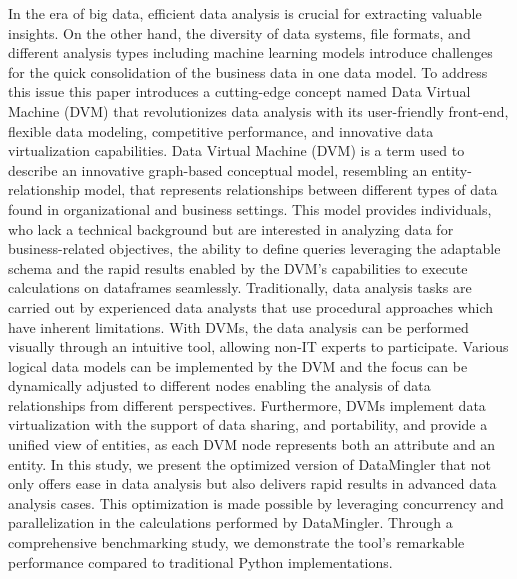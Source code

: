 In the era of big data, efficient data analysis is crucial for extracting valuable insights. On the other hand, the diversity of data systems, file formats, and different analysis types including machine learning models introduce challenges for the quick consolidation of the business data in one data model. To address this issue this paper introduces a cutting-edge concept named Data Virtual Machine (DVM) that revolutionizes data analysis with its user-friendly front-end, flexible data modeling, competitive performance, and innovative data virtualization capabilities. Data Virtual Machine (DVM) is a term used to describe an innovative graph-based conceptual model, resembling an entity-relationship model, that represents relationships between different types of data found in organizational and business settings. This model provides individuals, who lack a technical background but are interested in analyzing data for business-related objectives, the ability to define queries leveraging the adaptable schema and the rapid results enabled by the DVM's capabilities to execute calculations on dataframes seamlessly. Traditionally, data analysis tasks are carried out by experienced data analysts that use procedural approaches which have inherent limitations. With DVMs, the data analysis can be performed visually through an intuitive tool, allowing non-IT experts to participate. Various logical data models can be implemented by the DVM and the focus can be dynamically adjusted to different nodes enabling the analysis of data relationships from different perspectives. Furthermore, DVMs implement data virtualization with the support of data sharing, and portability, and provide a unified view of entities, as each DVM node represents both an attribute and an entity. In this study, we present the optimized version of DataMingler that not only offers ease in data analysis but also delivers rapid results in advanced data analysis cases. This optimization is made possible by leveraging concurrency and parallelization in the calculations performed by DataMingler. Through a comprehensive benchmarking study, we demonstrate the tool's remarkable performance compared to traditional Python implementations.